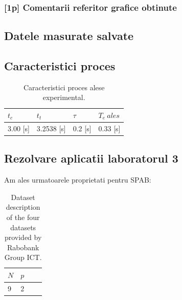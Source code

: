 \documentclass[12pt,english]{article}
\begin{document}
\subsubsection { [1p] Comentarii referitor grafice obtinute }
\subsection { Datele masurate salvate }
\subsection { Caracteristici proces }
\begin{table}[H]
  \centering
    \begin{tabular}{|l|l|l|l|}
      \hline
      $t_c$ & $t_t$ & $\tau$ & $T_e\ ales$ \\
      \hline
      3.00 [s] & 3.2538 [s] & 0.2 [s] & 0.33 [s] \\
      \hline
    \end{tabular}
    \caption{Caracteristici proces alese experimental.}
\end{table}

\subsection { Rezolvare aplicatii laboratorul 3 }
Am ales urmatoarele proprietati pentru SPAB:
\begin{table}[h!]
  \centering
    \begin{tabular}{|l|l|l|l|}
      \hline
      $N$ & $p$ \\
      \hline
      9 & 2 \\
      \hline
    \end{tabular}
    \caption{Dataset description of the four datasets provided by Rabobank Group ICT.}
\end{table}

\begin{center}
\end{center}
\end{document}
